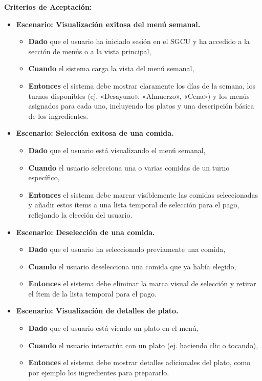 \documentclass[12pt]{article}
\begin{document}
\textbf{Criterios de Aceptación:}
\begin{itemize}
	\item \textbf{Escenario: Visualización exitosa del menú semanal.}
	\begin{itemize}
		\item \textbf{Dado} que el usuario ha iniciado sesión en el SGCU y ha accedido a la sección de menús o a la vista principal,
		\item \textbf{Cuando} el sistema carga la vista del menú semanal,
		\item \textbf{Entonces} el sistema debe mostrar claramente los días de la semana, los turnos disponibles (ej. «Desayuno», «Almuerzo», «Cena») y los menús asignados para cada uno, incluyendo los platos y una descripción básica de los ingredientes.
	\end{itemize}

	\item \textbf{Escenario: Selección exitosa de una comida.}
	\begin{itemize}
		\item \textbf{Dado} que el usuario está visualizando el menú semanal,
		\item \textbf{Cuando} el usuario selecciona una o varias comidas de un turno específico,
		\item \textbf{Entonces} el sistema debe marcar visiblemente las comidas seleccionadas y añadir estos ítems a una lista temporal de selección para el pago, reflejando la elección del usuario.
	\end{itemize}

	\item \textbf{Escenario: Deselección de una comida.}
	\begin{itemize}
		\item \textbf{Dado} que el usuario ha seleccionado previamente una comida,
		\item \textbf{Cuando} el usuario deselecciona una comida que ya había elegido,
		\item \textbf{Entonces} el sistema debe eliminar la marca visual de selección y retirar el ítem de la lista temporal para el pago.
	\end{itemize}

	\item \textbf{Escenario: Visualización de detalles de plato.}
	\begin{itemize}
		\item \textbf{Dado} que el usuario está viendo un plato en el menú,
		\item \textbf{Cuando} el usuario interactúa con un plato (ej. haciendo clic o tocando),
		\item \textbf{Entonces} el sistema debe mostrar detalles adicionales del plato, como por ejemplo los ingredientes para prepararlo.
	\end{itemize}
\end{itemize}
\end{document}
